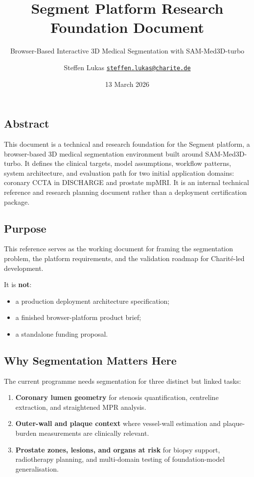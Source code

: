\documentclass[
  11pt,
]{article}
\title{Segment Platform Research Foundation Document}
\subtitle{Browser-Based Interactive 3D Medical Segmentation with
SAM-Med3D-turbo}
\author{Steffen Lukas
\href{mailto:steffen.lukas@charite.de}{\nolinkurl{steffen.lukas@charite.de}}}
\date{13 March 2026}
\providecommand{\tightlist}{%
  \setlength{\itemsep}{0pt}\setlength{\parskip}{0pt}}
\begin{document}
\maketitle

{
\setcounter{tocdepth}{2}
\tableofcontents
}
\subsection*{Abstract}\label{abstract}

This document is a technical and research foundation for the Segment
platform, a browser-based 3D medical segmentation environment built
around SAM-Med3D-turbo. It defines the clinical targets, model
assumptions, workflow patterns, system architecture, and evaluation path
for two initial application domains: coronary CCTA in DISCHARGE and
prostate mpMRI. It is an internal technical reference and research
planning document rather than a deployment certification package.

\subsection*{Purpose}\label{purpose}

This reference serves as the working document for framing the
segmentation problem, the platform requirements, and the validation
roadmap for Charité-led development.

It is \textbf{not}:

\begin{itemize}
\tightlist
\item
  a production deployment architecture specification;
\item
  a finished browser-platform product brief;
\item
  a standalone funding proposal.
\end{itemize}

\subsection*{Why Segmentation Matters
Here}\label{why-segmentation-matters-here}

The current programme needs segmentation for three distinct but linked
tasks:

\begin{enumerate}
\def\labelenumi{\arabic{enumi}.}
\tightlist
\item
  \textbf{Coronary lumen geometry} for stenosis quantification,
  centreline extraction, and straightened MPR analysis.
\item
  \textbf{Outer-wall and plaque context} where vessel-wall estimation
  and plaque-burden measurements are clinically relevant.
\item
  \textbf{Prostate zones, lesions, and organs at risk} for biopsy
  support, radiotherapy planning, and multi-domain testing of
  foundation-model generalisation.
\end{enumerate}
\end{document}
